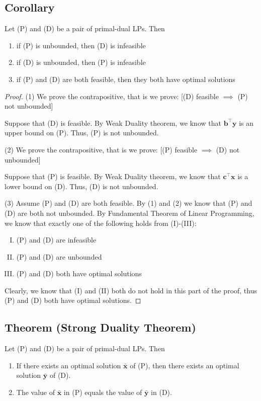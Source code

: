 \begin{thmbox}
    \subsection{Corollary}
    Let (P) and (D) be a pair of primal-dual LPs. Then
    \begin{enumerate}[(1)]
        \item if (P) is unbounded, then (D) is infeasible
        \item if (D) is unbounded, then (P) is infeasible
        \item if (P) and (D) are both feasible, then they both
        have optimal solutions
    \end{enumerate}
\end{thmbox}

\begin{proof}
    (1) We prove the contrapositive, that is we prove:
    [(D) feasible $ \implies $ (P) not unbounded]

    Suppose that (D) is feasible. By Weak Duality theorem, we know that
    $ \bm{b}^\top \bm{y} $ is an upper bound on (P). Thus, (P) is not
    unbounded.

    (2) We prove the contrapositive, that is we prove:
    [(P) feasible $ \implies $ (D) not unbounded]

    Suppose that (P) is feasible. By Weak Duality theorem, we know that
    $ \bm{c}^\top \bm{x} $ is a lower bound on (D). Thus, (D) is not
    unbounded.

    (3) Assume (P) and (D) are both feasible. By (1) and (2) we know that
    (P) and (D) are both not unbounded. By Fundamental Theorem of Linear
    Programming, we know that exactly one of the following holds 
    from (I)-(III):
    \begin{enumerate}[(I)]
        \item (P) and (D) are infeasible
        \item (P) and (D) are unbounded
        \item (P) and (D) both have optimal solutions
    \end{enumerate}
    Clearly, we know that (I) and (II) both do not hold in this part of the proof,
    thus (P) and (D) both have optimal solutions.
\end{proof}

\begin{thmbox}
    \subsection{Theorem (Strong Duality Theorem)}
    Let (P) and (D) be a pair of primal-dual LPs. Then
    \begin{enumerate}[(1)]
        \item If there exists an optimal solution $ \bm{\bar{x}} $ of (P), then there exists an optimal solution $ \bm{\bar{y}} $ of (D).
        \item The value of $ \bm{\bar{x}} $ in (P) equals the value of $ \bm{\bar{y}} $ in (D).
    \end{enumerate}
\end{thmbox}

